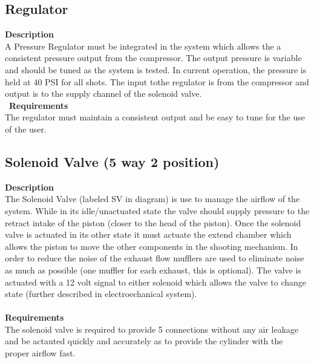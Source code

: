 \documentclass[titlepage]{article}
\begin{document}
\begin{center}
\begin{center}
\begin{center}
\begin{center}
\begin{center}
\begin{center}
\begin{center}
\begin{center}
\begin{center}
\begin{center}
\begin{center}
\begin{center}
\begin{center}
\begin{center}

\subsection{Regulator}
\textbf{Description}\\
A Pressure Regulator must be integrated in the system which allows the a consistent pressure output from the compressor. The output pressure is variable and should be tuned as the system is tested. In current operation, the pressure is held at 40 PSI for all shots. The input tothe regulator is from the compressor and output is to the supply channel of the solenoid valve.\\\
\textbf{Requirements}\\
The regulator must maintain a consistent output and be easy to tune for the use of the user. 
\begin{center}



\subsection{Solenoid Valve (5 way 2 position)}
\textbf{Description}\\
The Solenoid Valve (labeled SV in diagram) is use to manage the airflow of the system. While in its idle/unactuated state the valve should supply pressure to the retract intake of the piston (closer to the head of the piston). Once the solenoid valve is actuated in its other state it must actuate the extend chamber which allows the piston to move the other components in the shooting mechanism. In order to reduce the noise of the exhaust flow mufflers are used to eliminate noise as much as possible (one muffler for each exhaust, this is optional). The valve is actuated with a 12 volt signal to either solenoid which allows the valve to change state (further described in electroechanical system). \\\\
\textbf{Requirements}\\
The solenoid valve is required to provide 5 connections without any air leakage and be actauted quickly and accurately as to provide the cylinder with the proper airflow fast.
\begin{center}



\end{center}
\end{center}
\end{center}
\end{center}
\end{center}
\end{center}
\end{center}
\end{center}
\end{center}
\end{center}
\end{center}
\end{center}
\end{center}
\end{center}
\end{center}
\end{center}
\end{document}
